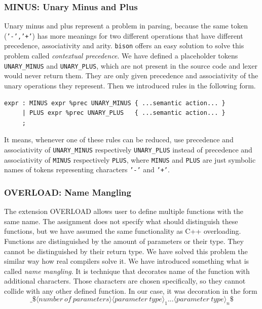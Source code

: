 \documentclass[12pt]{article}
\begin{document}
\subsubsection{MINUS: Unary Minus and Plus}
Unary minus and plus represent a problem in parsing, because the same token (\texttt{'-','+'}) has more meanings for two
different operations that have different precedence, associativity and arity. \texttt{bison} offers an easy solution to solve
this problem called \emph{contextual precedence}. We have defined a placeholder tokens \texttt{UNARY\_MINUS} and \texttt{UNARY\_PLUS},
which are not present in the source code and lexer would never return them. They are only given precedence and associativity of
the unary operations they represent. Then we introduced rules in the following form.
\begin{lstlisting}
expr : MINUS expr %prec UNARY_MINUS { ...semantic action... }
     | PLUS expr %prec UNARY_PLUS   { ...semantic action... }
     ;
\end{lstlisting}

It means, whenever one of these rules can be reduced, use precedence and associativity of \texttt{UNARY\_MINUS} respectively \texttt{UNARY\_PLUS}
instead of precedence and associativity of \texttt{MINUS} respectively \texttt{PLUS}, where \texttt{MINUS} and \texttt{PLUS} are just symbolic
names of tokens representing characters \texttt{'-'} and \texttt{'+'}.

\subsubsection{OVERLOAD: Name Mangling}
The extension OVERLOAD allows user to define multiple functions with the same name. The assignment does not specify what should distinguish these functions,
but we have assumed the same functionality as C++ overloading. Functions are distinguished by the amount of parameters or their type. They cannot be distinguished
by their return type. We have solved this problem the similar way how real compilers solve it. We have introduced something what is called \emph{name mangling}.
It is technique that decorates name of the function with additional characters. Those characters are chosen specifically, so they cannot collide with any other
defined function. In our case, it was decoration in the form
\begin{equation*}
	\texttt{\_\$}\langle number\ of\ parameters \rangle\langle parameter\ type\rangle_{1}...\langle parameter\ type\rangle_{n}\texttt{\$}
\end{equation*}
\end{document}
